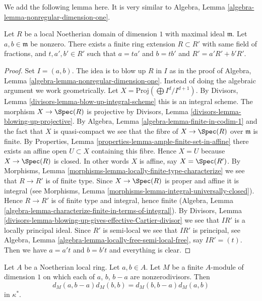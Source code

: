 \noindent
We add the following lemma here. It is very similar to
Algebra, Lemma \ref{algebra-lemma-nonregular-dimension-one}.

\begin{lemma}
\label{lemma-Noetherian-domain-dim-1-two-elements}
Let $R$ be a local Noetherian domain of dimension $1$
with maximal ideal $\mathfrak m$.
Let $a, b \in \mathfrak m$ be nonzero. There exists a finite
ring extension $R \subset R'$ with same field of fractions,
and $t, a', b' \in R'$ such that $a = ta'$ and $b = tb'$ and
$R' = a'R' + b'R'$.
\end{lemma}

\begin{proof}
Set $I = (a, b)$. The idea is to blow up $R$ in $I$ as in
the proof of Algebra, Lemma \ref{algebra-lemma-nonregular-dimension-one}.
Instead of doing the algebraic argument we work geometrically.
Let $X = \text{Proj}(\bigoplus I^d/I^{d + 1})$.
By Divisors, Lemma \ref{divisors-lemma-blow-up-integral-scheme}
this is an integral scheme.
The morphism $X \to \Spec(R)$ is projective by
Divisors, Lemma \ref{divisors-lemma-blowing-up-projective}.
By Algebra, Lemma \ref{algebra-lemma-finite-in-codim-1} and the fact that
$X$ is quasi-compact we see that the fibre of $X \to \Spec(R)$
over $\mathfrak m$ is finite.
By Properties, Lemma \ref{properties-lemma-ample-finite-set-in-affine}
there exists an affine open $U \subset X$
containing this fibre.
Hence $X = U$ because $X \to \Spec(R)$ is closed.
In other words $X$ is affine, say $X = \Spec(R')$.
By Morphisms, Lemma \ref{morphisms-lemma-locally-finite-type-characterize}
we see that $R \to R'$ is of finite type. Since $X \to \Spec(R)$ is
proper and affine it is integral (see
Morphisms, Lemma \ref{morphisms-lemma-integral-universally-closed}).
Hence $R \to R'$ is of finite type and integral, hence finite
(Algebra, Lemma \ref{algebra-lemma-characterize-finite-in-terms-of-integral}).
By Divisors,
Lemma \ref{divisors-lemma-blowing-up-gives-effective-Cartier-divisor}
we see that $IR'$ is a locally principal ideal.
Since $R'$ is semi-local we see that $IR'$ is principal,
see Algebra, Lemma \ref{algebra-lemma-locally-free-semi-local-free},
say $IR' = (t)$. Then we have $a = a't$ and $b = b't$ and everything is
clear.
\end{proof}

\begin{lemma}
\label{lemma-symbol-is-steinberg-prepare}
Let $A$ be a Noetherian local ring.
Let $a, b \in A$.
Let $M$ be a finite $A$-module of dimension $1$ on
which each of $a$, $b$, $b - a$ are nonzerodivisors.
Then
$$
d_M(a, b - a)d_M(b, b) = d_M(b, b - a)d_M(a, b)
$$
in $\kappa^*$.
\end{lemma}

